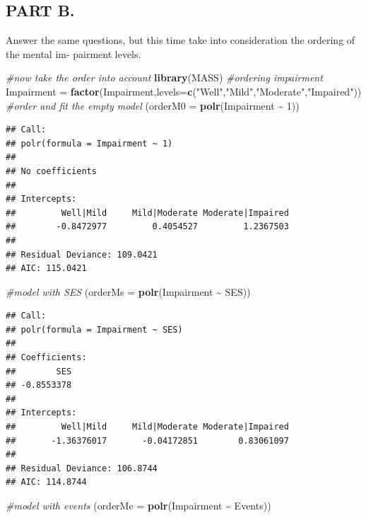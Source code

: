 \documentclass[
]{article}
\newenvironment{Shaded}{\begin{snugshade}}{\end{snugshade}}
\newcommand{\AttributeTok}[1]{\textcolor[rgb]{0.13,0.29,0.53}{#1}}
\newcommand{\CommentTok}[1]{\textcolor[rgb]{0.56,0.35,0.01}{\textit{#1}}}
\newcommand{\DecValTok}[1]{\textcolor[rgb]{0.00,0.00,0.81}{#1}}
\newcommand{\FunctionTok}[1]{\textcolor[rgb]{0.13,0.29,0.53}{\textbf{#1}}}
\newcommand{\NormalTok}[1]{#1}
\newcommand{\OtherTok}[1]{\textcolor[rgb]{0.56,0.35,0.01}{#1}}
\newcommand{\SpecialCharTok}[1]{\textcolor[rgb]{0.81,0.36,0.00}{\textbf{#1}}}
\newcommand{\StringTok}[1]{\textcolor[rgb]{0.31,0.60,0.02}{#1}}
\begin{document}
\subsection{PART B.}\label{part-b.}

Answer the same questions, but this time take into consideration the
ordering of the mental im- pairment levels.

\begin{Shaded}
\begin{Highlighting}[]
\CommentTok{\#now take the order into account}
\FunctionTok{library}\NormalTok{(MASS)}
\CommentTok{\#ordering impairment}
\NormalTok{Impairment }\OtherTok{=} \FunctionTok{factor}\NormalTok{(Impairment,}\AttributeTok{levels=}\FunctionTok{c}\NormalTok{(}\StringTok{"Well"}\NormalTok{,}\StringTok{"Mild"}\NormalTok{,}\StringTok{"Moderate"}\NormalTok{,}\StringTok{"Impaired"}\NormalTok{))}
\CommentTok{\#order and fit the empty model}
\NormalTok{(}\AttributeTok{orderM0 =} \FunctionTok{polr}\NormalTok{(Impairment }\SpecialCharTok{\textasciitilde{}} \DecValTok{1}\NormalTok{))}
\end{Highlighting}
\end{Shaded}

\begin{verbatim}
## Call:
## polr(formula = Impairment ~ 1)
## 
## No coefficients
## 
## Intercepts:
##         Well|Mild     Mild|Moderate Moderate|Impaired 
##        -0.8472977         0.4054527         1.2367503 
## 
## Residual Deviance: 109.0421 
## AIC: 115.0421
\end{verbatim}

\begin{Shaded}
\begin{Highlighting}[]
\CommentTok{\#model with SES}
\NormalTok{(}\AttributeTok{orderMs =} \FunctionTok{polr}\NormalTok{(Impairment }\SpecialCharTok{\textasciitilde{}}\NormalTok{ SES))}
\end{Highlighting}
\end{Shaded}

\begin{verbatim}
## Call:
## polr(formula = Impairment ~ SES)
## 
## Coefficients:
##        SES 
## -0.8553378 
## 
## Intercepts:
##         Well|Mild     Mild|Moderate Moderate|Impaired 
##       -1.36376017       -0.04172851        0.83061097 
## 
## Residual Deviance: 106.8744 
## AIC: 114.8744
\end{verbatim}

\begin{Shaded}
\begin{Highlighting}[]
\CommentTok{\#model with events}
\NormalTok{(}\AttributeTok{orderMe =} \FunctionTok{polr}\NormalTok{(Impairment }\SpecialCharTok{\textasciitilde{}}\NormalTok{ Events))}
\end{Highlighting}
\end{Shaded}
\end{document}

